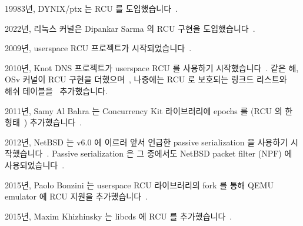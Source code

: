19983년, DYNIX/ptx 는 RCU 를 도입했습니다~\cite{McKenney98,Slingwine95}.

2022년, 리눅스 커널은 Dipankar Sarma 의 RCU 구현을
도입했습니다~\cite{Torvalds2.5.43}.

2009년, userspace RCU 프로젝트가
시작되었습니다~\cite{MathieuDesnoyers2009URCU}.

2010년, Knot DNS 프로젝트가 userspace RCU 를 사용하기
시작했습니다~\cite{LubosSlovak2010KnotDNSRCU}.
같은 해, OSv 커널이 RCU 구현을 더했으며~\cite{AviKivity2013OSvRCU}, 나중에는
RCU 로 보호되는 링크드 리스트와~\cite{AviKivity2013OSvRCUlist} 해쉬
테이블을~\cite{AviKivity2013OSvRCUhash} 추가했습니다.

2011년, Samy Al Bahra 는 Concurrency Kit 라이브러리에 epochs 를 (RCU 의 한
형태~\cite{UCAM-CL-TR-579,KeirFraser2007withoutLocks})
추가했습니다~\cite{SamyAlBahra2011ckEpoch}.

\iffalse

IBM's VM/XA is adopted passive serialization, a mechanism similar to
RCU, some time in the 1980s~\cite{Hennessy89}.

DYNIX/ptx adopted RCU in 1993~\cite{McKenney98,Slingwine95}.

The Linux kernel adopted Dipankar Sarma's implementation of RCU in
2002~\cite{Torvalds2.5.43}.

The userspace RCU project started in 2009~\cite{MathieuDesnoyers2009URCU}.

The Knot DNS project started using the userspace RCU
library in 2010~\cite{LubosSlovak2010KnotDNSRCU}.
That same year, the OSv kernel added an RCU
implementation~\cite{AviKivity2013OSvRCU},
later adding an RCU-protected linked list~\cite{AviKivity2013OSvRCUlist}
and an RCU-protected hash table~\cite{AviKivity2013OSvRCUhash}.

In 2011, Samy Al Bahra added epochs
(a form of RCU~\cite{UCAM-CL-TR-579,KeirFraser2007withoutLocks})
to the Concurrency Kit
library~\cite{SamyAlBahra2011ckEpoch}.

\fi

2012년, NetBSD 는 v6.0 에 이르러 앞서 언급한 passive serialization 을 사용하기
시작했습니다~\cite{NetBSD2012pserialize}.
Passive serialization 은 그 중에서도 NetBSD packet filter (NPF) 에
사용되었습니다~\cite{MindaugasRasiukevicius2014NPFRCU}.

2015년, Paolo Bonzini 는 userspace RCU 라이브러리의 fork 를 통해 QEMU emulator
에 RCU 지원을 추가했습니다~\cite{MikeDay2013RCUqemu,PaoloBonzini2013QEMURCU}.

2015년, Maxim Khizhinsky 는 libcds 에 RCU 를
추가했습니다~\cite{MaxKhiszinsky2015C++RCU}.

